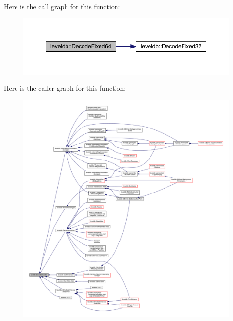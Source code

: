 Here is the call graph for this function\+:\nopagebreak
\begin{figure}[H]
\begin{center}
\leavevmode
\includegraphics[width=350pt]{namespaceleveldb_a239098b0291873752d0be16633652825_cgraph}
\end{center}
\end{figure}




Here is the caller graph for this function\+:
\nopagebreak
\begin{figure}[H]
\begin{center}
\leavevmode
\includegraphics[width=350pt]{namespaceleveldb_a239098b0291873752d0be16633652825_icgraph}
\end{center}
\end{figure}


\hypertarget{namespaceleveldb_a7819fbf4e9f594d28aa16cd6287a0b37}{}
